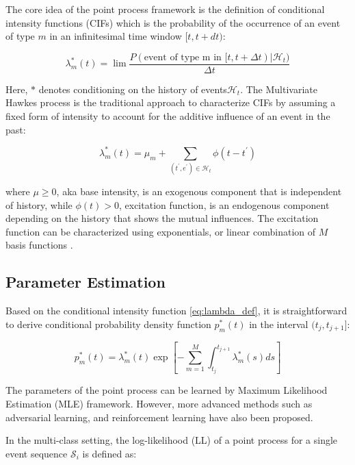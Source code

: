 \documentclass[journal,twoside,web]{ieeecolor}
\begin{document}
The core idea of the point process framework is the definition of conditional intensity functions (CIFs) which is the probability of the occurrence of an event of type $m$ in an infinitesimal time window $[t,t+dt)$:

\begin{equation} \label{eq:lambda_def}
   \lambda_m^{*}(t)=\lim \frac{P(  \text{event of type m in } [t,t+\Delta t) |   \mathcal{H}_t  )}{\Delta t} 
\end{equation} 

Here, $*$ denotes conditioning on the history of events$\mathcal{H}_t$. The Multivariate Hawkes process is the traditional approach to characterize CIFs by assuming a fixed form of intensity to account for the additive influence of an event in the past:

\begin{equation} 
    \lambda_m^{*}(t)= \mu_m + \sum_{(t^{\prime},e^{\prime})\in \mathcal{H}_t} \phi(t-t^{\prime})
 \end{equation} 

 where $\mu \ge 0 $, aka base intensity, is an exogenous component that is independent of history, while $\phi(t)>0$, excitation function, is an endogenous component depending on the history that shows the mutual influences. The excitation function can be characterized using exponentials, or linear combination of $M$ basis functions \cite*{xuLearningGrangerCausality2016}.



 \subsection{Parameter Estimation}

 Based on the conditional intensity function \ref*{eq:lambda_def}, it is straightforward to derive conditional probability density function $p^{*}_{m}(t)$ in the interval $(t_j, t_{j+1}]$:
 
 \begin{equation} 
     p_m^{*}(t)=\lambda_m^{*}(t) \exp \left[-\sum_{m=1}^{M} \int_{t_j}^{t_{j+1}}\lambda_m^{*}(s)ds\right]
  \end{equation}
  
 
  The parameters of the point process can be learned by Maximum Likelihood Estimation (MLE) framework. However, more advanced methods such as adversarial learning, and reinforcement learning have also been proposed.
 
 In the multi-class setting, the log-likelihood (LL) of a point process for a single event sequence $\mathcal{S}_{i}$ is defined as:
 
\end{document}
